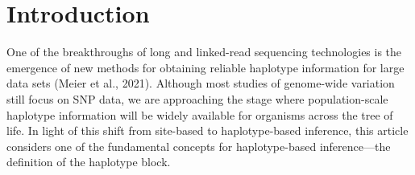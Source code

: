 \documentclass[twocolumn]{bmcart}%
\begin{document}


\section*{Introduction}
One of the breakthroughs of long and linked-read sequencing technologies is the emergence of new methods for obtaining reliable haplotype information for large data sets (Meier et al., 2021). Although most studies of genome-wide variation still focus on SNP data, we are approaching the stage where population-scale haplotype information will be widely available for organisms across the tree of life. In light of this shift from site-based to haplotype-based inference, this article considers one of the fundamental concepts for haplotype-based inference—the definition of the haplotype block.
\end{document}
